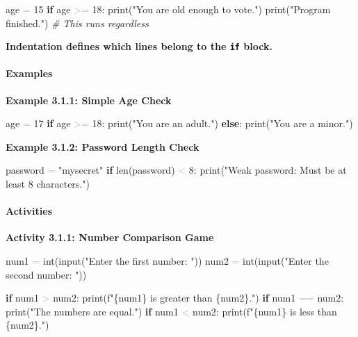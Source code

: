 \documentclass[
  justified,
  openright,
]{tufte-book}
\let\subsection\paragraph
\let\paragraph\paragraph
\newcommand{\KeywordTok}[1]{\textcolor{CodeKeyword}{\textbf{#1}}}  %
\newcommand{\StringTok}[1]{\textcolor{CodeString}{#1}}              %
\newcommand{\CommentTok}[1]{\textcolor{CodeComment}{\textit{#1}}}  %
\newcommand{\CodeNumTok}[1]{\textcolor{CodeNumber}{#1}}             %
\newcommand{\OperatorTok}[1]{\textcolor{DarkGray}{#1}}              %
\newenvironment{Shaded}{%
  \begin{mdframed}[style=TufteCode]%
}{%
  \end{mdframed}%
}
\let\subsection\paragraph
\let\paragraph\paragraph
\begin{document}
\begin{Shaded}
\begin{Highlighting}[]
age \OperatorTok{=} \CodeNumTok{15}
\KeywordTok{if} age \OperatorTok{\textgreater{}=} \CodeNumTok{18}:
    print(\StringTok{"You are old enough to vote."})
print(\StringTok{"Program finished."})  \CommentTok{\# This runs regardless}
\end{Highlighting}
\end{Shaded}

\textbf{Indentation defines which lines belong to the \texttt{if}
block.}

\subsection{Examples}\label{examples-6}

\textbf{Example 3.1.1: Simple Age Check}

\begin{Shaded}
\begin{Highlighting}[]
age \OperatorTok{=} \CodeNumTok{17}
\KeywordTok{if} age \OperatorTok{\textgreater{}=} \CodeNumTok{18}:
    print(\StringTok{"You are an adult."})
\KeywordTok{else}:
    print(\StringTok{"You are a minor."})
\end{Highlighting}
\end{Shaded}

\textbf{Example 3.1.2: Password Length Check}

\begin{Shaded}
\begin{Highlighting}[]
password \OperatorTok{=} \StringTok{"mysecret"}
\KeywordTok{if} len(password) \OperatorTok{\textless{}} \CodeNumTok{8}:
    print(\StringTok{"Weak password: Must be at least 8 characters."})
\end{Highlighting}
\end{Shaded}

\subsection{Activities}\label{activities-7}

\textbf{Activity 3.1.1: Number Comparison Game}

\begin{Shaded}
\begin{Highlighting}[]
num1 \OperatorTok{=} int(input(\StringTok{"Enter the first number: "}))
num2 \OperatorTok{=} int(input(\StringTok{"Enter the second number: "}))
 
\KeywordTok{if} num1 \OperatorTok{\textgreater{}} num2:
    print(\StringTok{f"}\StringTok{\{}num1\StringTok{\}}\StringTok{ is greater than }\StringTok{\{}num2\StringTok{\}}\StringTok{."})
\KeywordTok{if} num1 \OperatorTok{==} num2:
    print(\StringTok{"The numbers are equal."})
\KeywordTok{if} num1 \OperatorTok{\textless{}} num2:
    print(\StringTok{f"}\StringTok{\{}num1\StringTok{\}}\StringTok{ is less than }\StringTok{\{}num2\StringTok{\}}\StringTok{."})
\end{Highlighting}
\end{Shaded}
\end{document}

